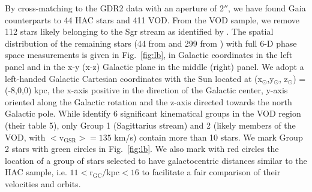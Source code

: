 \documentclass[a4paper,useAMS,usenatbib]{mnras}
\begin{document}
By cross-matching to the GDR2 data with an aperture of 2$''$, we have
found Gaia counterparts to 44 HAC stars and 411 VOD. From the VOD
sample, we remove 112 stars likely belonging to the Sgr stream as
identified by \citep[][, their Group 1]{Vivas2016}. The spatial
distribution of the remaining stars (44 from \citealt{Simion2018} and
299 from \citealt{Vivas2016}) with full 6-D phase space measurements
is given in Fig.~\ref{fig:lb}, in Galactic coordinates in the left
panel and in the x-y (x-z) Galactic plane in the middle (right)
panel. We adopt a left-handed Galactic Cartesian coordinates with the
Sun located at (x$_{\odot}$,y$_{\odot}$, z$_{\odot}$) = (-8,0,0) kpc,
the x-axis positive in the direction of the Galactic center, y-axis
oriented along the Galactic rotation and the z-axis directed towards
the north Galactic pole. While \citealt{Vivas2016} identify 6
significant kinematical groups in the VOD region (their table 5), only
Group 1 (Sagittarius stream) and 2 (likely members of the VOD, with
$\mathrm{<v_{GSR}>}= 135$ km/s) contain more than 10 stars. We mark
Group 2 stars with green circles in Fig.~\ref{fig:lb}. We also mark with
red circles the location of a group of stars selected to have
galactocentric distances similar to the HAC sample, i.e.
$11\mathrm{<r_{GC}}/$kpc$<16$ to facilitate a fair comparison of their
velocities and orbits.
%
\end{document}
